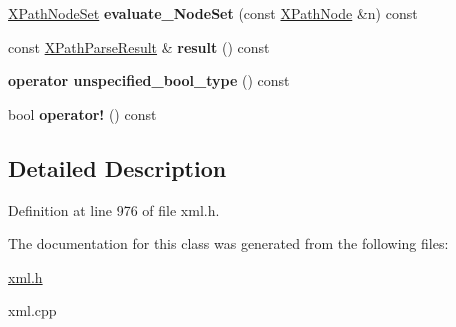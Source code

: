 \begin{DoxyCompactItemize}
\item 
\hypertarget{classphys_1_1xml_1_1XPathQuery_a3b9b33f1db717e2f356e766c97c71f8c}{
\hyperlink{classphys_1_1xml_1_1XPathNodeSet}{XPathNodeSet} {\bfseries evaluate\_\-NodeSet} (const \hyperlink{classphys_1_1xml_1_1XPathNode}{XPathNode} \&n) const }
\label{de/d52/classphys_1_1xml_1_1XPathQuery_a3b9b33f1db717e2f356e766c97c71f8c}

\item 
\hypertarget{classphys_1_1xml_1_1XPathQuery_ab2d3a78adf02f6e1546fc60203884877}{
const \hyperlink{structphys_1_1xml_1_1XPathParseResult}{XPathParseResult} \& {\bfseries result} () const }
\label{de/d52/classphys_1_1xml_1_1XPathQuery_ab2d3a78adf02f6e1546fc60203884877}

\item 
\hypertarget{classphys_1_1xml_1_1XPathQuery_a783704bb9a83379b6c8dadbfb5a835ce}{
{\bfseries operator unspecified\_\-bool\_\-type} () const }
\label{de/d52/classphys_1_1xml_1_1XPathQuery_a783704bb9a83379b6c8dadbfb5a835ce}

\item 
\hypertarget{classphys_1_1xml_1_1XPathQuery_a6dc902dc41beff8cf60e978fa2dc8861}{
bool {\bfseries operator!} () const }
\label{de/d52/classphys_1_1xml_1_1XPathQuery_a6dc902dc41beff8cf60e978fa2dc8861}

\end{DoxyCompactItemize}


\subsection{Detailed Description}


Definition at line 976 of file xml.h.



The documentation for this class was generated from the following files:\begin{DoxyCompactItemize}
\item 
\hyperlink{xml_8h}{xml.h}\item 
xml.cpp\end{DoxyCompactItemize}
